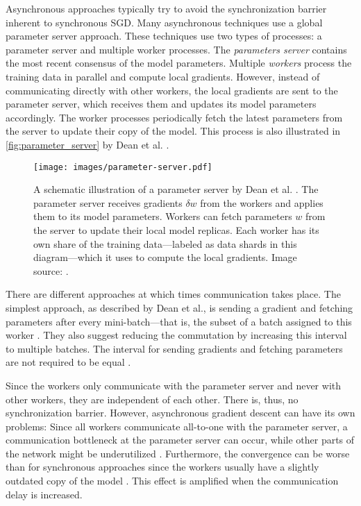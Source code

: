 \documentclass[conference,compsoc,a4paper]{IEEEtran}
\begin{document}
Asynchronous approaches typically try to avoid the synchronization barrier inherent to synchronous SGD.
%
Many asynchronous techniques use a global parameter server approach.
These techniques use two types of processes: a parameter server and multiple worker processes.
The \emph{parameters server} contains the most recent consensus of the model parameters.
Multiple \emph{workers} process the training data in parallel and compute local gradients.
However, instead of communicating directly with other workers, the local gradients are sent to the parameter server, which receives them and updates its model parameters accordingly.
The worker processes periodically fetch the latest parameters from the server to update their copy of the model.
This process is also illustrated in \autoref{fig:parameter_server} by Dean et al. \cite{dean2012-Large-scale-distributed}.

\begin{figure}[ht]
\centering
\texttt{[image: images/parameter-server.pdf]}
\caption{
A schematic illustration of a parameter server by Dean et al. \cite{dean2012-Large-scale-distributed}.
The parameter server receives gradients $\delta w$ from the workers and applies them to its model parameters.
Workers can fetch parameters $w$ from the server to update their local model replicas.
Each worker has its own share of the training data---labeled as data shards in this diagram---which it uses to compute the local gradients.
Image source: \cite{dean2012-Large-scale-distributed}.
}
\label{fig:parameter_server}
\end{figure}

There are different approaches at which times communication takes place.
The simplest approach, as described by Dean et al., is sending a gradient and fetching parameters after every mini-batch---that is, the subset of a batch assigned to this worker \cite{dean2012-Large-scale-distributed}.
They also suggest reducing the commutation by increasing this interval to multiple batches.
The interval for sending gradients and fetching parameters are not required to be equal \cite{dean2012-Large-scale-distributed}.

Since the workers only communicate with the parameter server and never with other workers, they are independent of each other.
There is, thus, no synchronization barrier.
However, asynchronous gradient descent can have its own problems:
Since all workers communicate all-to-one with the parameter server, a communication bottleneck at the parameter server can occur, while other parts of the network might be underutilized \cite{jin2016-How-to-scale}.
Furthermore, the convergence can be worse than for synchronous approaches since the workers usually have a slightly outdated copy of the model \cite{jin2016-How-to-scale,chen2016-Revisiting-distributed-synchronous-SGD}.
This effect is amplified when the communication delay is increased.
\end{document}
